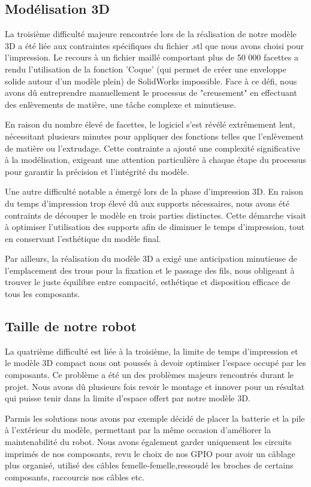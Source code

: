 \subsection{Modélisation 3D}
La troisième difficulté majeure rencontrée lors de la réalisation de notre modèle 3D a été liée aux contraintes spécifiques du fichier .stl que nous avons choisi pour l'impression. Le recours à un fichier maillé comportant plus de 50 000 facettes a rendu l'utilisation de la fonction 'Coque' (qui permet de créer une enveloppe solide autour d'un modèle plein) de SolidWorks impossible. Face à ce défi, nous avons dû entreprendre manuellement le processus de "creusement" en effectuant des enlèvements de matière, une tâche complexe et minutieuse.

En raison du nombre élevé de facettes, le logiciel s'est révélé extrêmement lent, nécessitant plusieurs minutes pour appliquer des fonctions telles que l'enlèvement de matière ou l'extrudage. Cette contrainte a ajouté une complexité significative à la modélisation, exigeant une attention particulière à chaque étape du processus pour garantir la précision et l'intégrité du modèle.

Une autre difficulté notable a émergé lors de la phase d'impression 3D. En raison du temps d'impression trop élevé dû aux supports nécessaires, nous avons été contraints de découper le modèle en trois parties distinctes. Cette démarche visait à optimiser l'utilisation des supports afin de diminuer le temps d'impression, tout en conservant l'esthétique du modèle final.

Par ailleurs, la réalisation du modèle 3D a exigé une anticipation minutieuse de l'emplacement des trous pour la fixation et le passage des fils, nous obligeant à trouver le juste équilibre entre compacité, esthétique et disposition efficace de tous les composants.

\subsection{Taille de notre robot}
La quatrième difficulté est liée à la troisième, la limite de temps d'impression et le modèle 3D compact nous ont poussés à devoir optimiser l'espace occupé par les composants. Ce problème a été un des problèmes majeurs rencontrés durant le projet. Nous avons dû plusieurs fois revoir le montage et innover pour un résultat qui puisse tenir dans la limite d'espace offert par notre modèle 3D.
 
 Parmis les solutions nous avons par exemple décidé de placer la batterie et la pile à l'extérieur du modèle, permettant par la même occasion d'améliorer la maintenabilité du robot. Nous avons également garder uniquement les circuits imprimés de nos composants, revu le choix de nos GPIO pour avoir un câblage plus organisé, utilisé des câbles femelle-femelle,ressoudé les broches de certains composants, raccourcis nos câbles etc.
 
